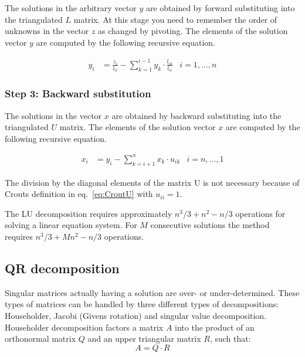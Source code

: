 The solutions in the arbitrary vector $y$ are obtained by forward
substituting into the triangulated $L$ matrix.  At this stage you need
to remember the order of unknowns in the vector $z$ as changed by
pivoting.  The elements of the solution vector $y$ are computed by the
following recursive equation.

\begin{align}
y_{i} &= \frac{z_{i}}{l_{ii}} - \sum_{k=1}^{i-1} y_{k}\cdot \frac{l_{ik}}{l_{ii}} & i = 1,\ldots,n
\end{align}

\subsubsection{Step 3: Backward substitution}
\label{sec:CroutBSubst}

The solutions in the vector $x$ are obtained by backward substituting
into the triangulated $U$ matrix.  The elements of the solution vector
$x$ are computed by the following recursive equation.

\begin{align}
x_{i} &= y_{i} - \sum_{k=i+1}^{n} x_{k}\cdot u_{ik} & i = n,\ldots,1
\end{align}

The division by the diagonal elements of the matrix U is not necessary
because of Crouts definition in eq.~\eqref{eq:CroutU} with $u_{ii} =
1$.

\addvspace{12pt}

The LU decomposition requires approximately $n^3/3 + n^2 - n/3$
operations for solving a linear equation system.  For $M$ consecutive
solutions the method requires $n^3/3 + Mn^2 - n/3$ operations.

\subsection{QR decomposition}

Singular matrices actually having a solution are over- or
under-determined.  These types of matrices can be handled by three
different types of decompositions: Householder, Jacobi (Givens
rotation) and singular value decomposition.  Householder decomposition
factors a matrix $A$ into the product of an orthonormal matrix $Q$ and
an upper triangular matrix $R$, such that:
\begin{equation}
A = Q\cdot R
\end{equation}

